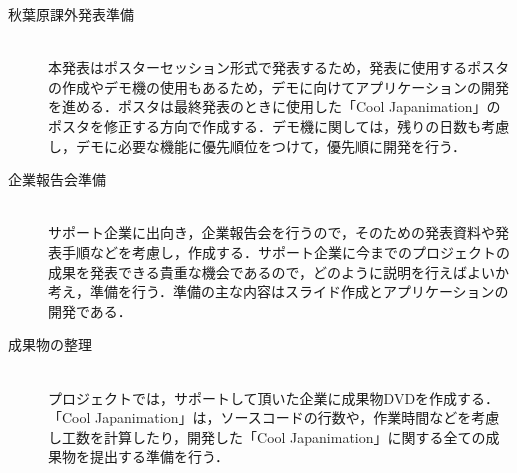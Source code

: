 \begin{description}
\item[秋葉原課外発表準備]\mbox{}\\
本発表はポスターセッション形式で発表するため，発表に使用するポスタの作成やデモ機の使用もあるため，デモに向けてアプリケーションの開発を進める．ポスタは最終発表のときに使用した「Cool Japanimation」のポスタを修正する方向で作成する．デモ機に関しては，残りの日数も考慮し，デモに必要な機能に優先順位をつけて，優先順に開発を行う．
\item[企業報告会準備]\mbox{}\\
サポート企業に出向き，企業報告会を行うので，そのための発表資料や発表手順などを考慮し，作成する．サポート企業に今までのプロジェクトの成果を発表できる貴重な機会であるので，どのように説明を行えばよいか考え，準備を行う．準備の主な内容はスライド作成とアプリケーションの開発である．
\item[成果物の整理]\mbox{}\\
プロジェクトでは，サポートして頂いた企業に成果物DVDを作成する．「Cool Japanimation」は，ソースコードの行数や，作業時間などを考慮し工数を計算したり，開発した「Cool Japanimation」に関する全ての成果物を提出する準備を行う．
\end{description}
